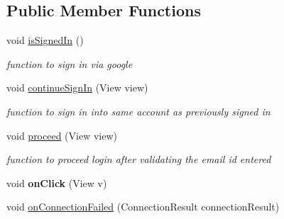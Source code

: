 \subsection*{Public Member Functions}
\begin{DoxyCompactItemize}
\item 
\hypertarget{classcom_1_1example_1_1sel_1_1lostfound_1_1MainActivity_a55b436bf176e21d22abf837dc8f2602c}{void \hyperlink{classcom_1_1example_1_1sel_1_1lostfound_1_1MainActivity_a55b436bf176e21d22abf837dc8f2602c}{is\-Signed\-In} ()}\label{classcom_1_1example_1_1sel_1_1lostfound_1_1MainActivity_a55b436bf176e21d22abf837dc8f2602c}

\begin{DoxyCompactList}\small\item\em function to sign in via google \end{DoxyCompactList}\item 
\hypertarget{classcom_1_1example_1_1sel_1_1lostfound_1_1MainActivity_af6914b0175f989ccb1c616f05a162f1a}{void \hyperlink{classcom_1_1example_1_1sel_1_1lostfound_1_1MainActivity_af6914b0175f989ccb1c616f05a162f1a}{continue\-Sign\-In} (View view)}\label{classcom_1_1example_1_1sel_1_1lostfound_1_1MainActivity_af6914b0175f989ccb1c616f05a162f1a}

\begin{DoxyCompactList}\small\item\em function to sign in into same account as previously signed in \end{DoxyCompactList}\item 
\hypertarget{classcom_1_1example_1_1sel_1_1lostfound_1_1MainActivity_a4618c5d451d4e0c2ce4562499a583ee5}{void \hyperlink{classcom_1_1example_1_1sel_1_1lostfound_1_1MainActivity_a4618c5d451d4e0c2ce4562499a583ee5}{proceed} (View view)}\label{classcom_1_1example_1_1sel_1_1lostfound_1_1MainActivity_a4618c5d451d4e0c2ce4562499a583ee5}

\begin{DoxyCompactList}\small\item\em function to proceed login after validating the email id entered \end{DoxyCompactList}\item 
\hypertarget{classcom_1_1example_1_1sel_1_1lostfound_1_1MainActivity_ac979afc8333ca7e81e7859cd383c614d}{void {\bfseries on\-Click} (View v)}\label{classcom_1_1example_1_1sel_1_1lostfound_1_1MainActivity_ac979afc8333ca7e81e7859cd383c614d}

\item 
\hypertarget{classcom_1_1example_1_1sel_1_1lostfound_1_1MainActivity_a15df38b4157a1f3a7c9dd7c8099e7495}{void \hyperlink{classcom_1_1example_1_1sel_1_1lostfound_1_1MainActivity_a15df38b4157a1f3a7c9dd7c8099e7495}{on\-Connection\-Failed} (Connection\-Result connection\-Result)}\label{classcom_1_1example_1_1sel_1_1lostfound_1_1MainActivity_a15df38b4157a1f3a7c9dd7c8099e7495}


\end{DoxyCompactItemize}
